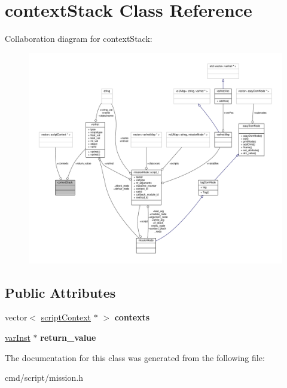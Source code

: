 \hypertarget{classcontextStack}{}\section{context\+Stack Class Reference}
\label{classcontextStack}


Collaboration diagram for context\+Stack\+:
\nopagebreak
\begin{figure}[H]
\begin{center}
\leavevmode
\includegraphics[width=350pt]{d4/d4b/classcontextStack__coll__graph}
\end{center}
\end{figure}
\subsection*{Public Attributes}
\begin{DoxyCompactItemize}
\item 
vector$<$ \hyperlink{classscriptContext}{script\+Context} $\ast$ $>$ {\bfseries contexts}\hypertarget{classcontextStack_a93a68856228e80fcdc52a9775b387063}{}\label{classcontextStack_a93a68856228e80fcdc52a9775b387063}

\item 
\hyperlink{classvarInst}{var\+Inst} $\ast$ {\bfseries return\+\_\+value}\hypertarget{classcontextStack_a53298c4d3203c6e6336a2d9380a40db5}{}\label{classcontextStack_a53298c4d3203c6e6336a2d9380a40db5}

\end{DoxyCompactItemize}


The documentation for this class was generated from the following file\+:\begin{DoxyCompactItemize}
\item 
cmd/script/mission.\+h\end{DoxyCompactItemize}
